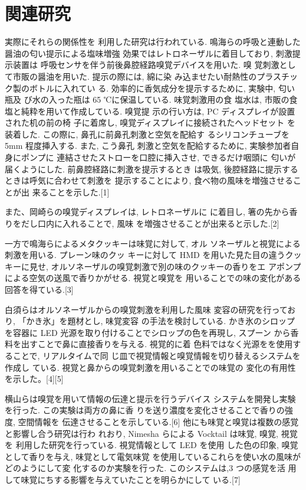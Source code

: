 \section{関連研究}

実際にそれらの関係性を
利用した研究は行われている.
鳴海らの呼吸と連動した醤油の匂い提示による塩味増強
効果ではレトロネーザルに着目しており, 刺激提示装置は
呼吸センサを伴う前後鼻腔経路嗅覚デバイスを用いた. 嗅
覚刺激として市販の醤油を用いた. 提示の際には, 綿に染
み込ませたい耐熱性のプラスチック製のボトルに入れてい
る. 効率的に香気成分を提示するために, 実験中, 匂い瓶及
び水の入った瓶は 65 ℃に保温している. 味覚刺激用の食
塩水は, 市販の食塩と純粋を用いて作成している. 嗅覚提
示の行い方は, PC ディスプレイが設置された机の前の椅
子に着席し, 嗅覚ディスプレイに接続されたヘッドセット
を装着した. この際に, 鼻孔に前鼻孔刺激と空気を配給す
るシリコンチューブを 5mm 程度挿入する. また, こう鼻孔
刺激と空気を配給するために, 実験参加者自身にポンプに
連結させたストローを口腔に挿入させ, できるだけ咽頭に
匂いが届くようにした. 前鼻腔経路に刺激を提示するとき
は吸気, 後腔経路に提示するときは呼気に合わせて刺激を
提示することにより, 食べ物の風味を増強させることが出
来ることを示した.[1]


また、岡崎らの嗅覚ディスプレイは, レトロネーザルに
に着目し, 箸の先から香りをだし口内に入れることで, 風味
を増強させることが出来ると示した.[2]


一方で鳴海らによるメタクッキーは味覚に対して, オル
ソネーザルと視覚による刺激を用いる. プレーン味のクッ
キーに対して HMD を用いた見た目の違うクッキーに見せ,
オルソネーザルの嗅覚刺激で別の味のクッキーの香りをエ
アポンプによる空気の送風で香りかがせる. 視覚と嗅覚を
用いることでの味の変化がある回答を得ている.[3]


白須らはオルソネーザルからの嗅覚刺激を利用した風味
変容の研究を行っており, 「かき氷」を題材とし, 味覚変容
の手法を検討している. かき氷のシロップを容器に LED
光源を取り付けることでシロップの色を再現し, スプーン
から香料を出すことで鼻に直接香りを与える. 視覚的に着
色料ではなく光源をを使用することで, リアルタイムで同
じ皿で視覚情報と嗅覚情報を切り替えるシステムを作成し
ている. 視覚と鼻からの嗅覚刺激を用いることでの味覚の
変化の有用性を示した。[4][5]


横山らは嗅覚を用いて情報の伝達と提示を行うデバイス
システムを開発し実験を行った. この実験は両方の鼻に香
りを送り濃度を変化させることで香りの強度, 空間情報を
伝達させることを示している.[6]
他にも味覚と嗅覚は複数の感覚と影響し合う研究は行わ
れおり, Nimesha らによる Vocktail は味覚, 嗅覚, 視覚を
利用した研究を行っている. 視覚情報として LED を使用
した色の印象, 嗅覚として香りを与え, 味覚として電気味覚
を使用しているこれらを使い水の風味がどのようにして変
化するのか実験を行った. このシステムは,3 つの感覚を活
用して味覚にちする影響を与えていたことを明らかにして
いる.[7]
